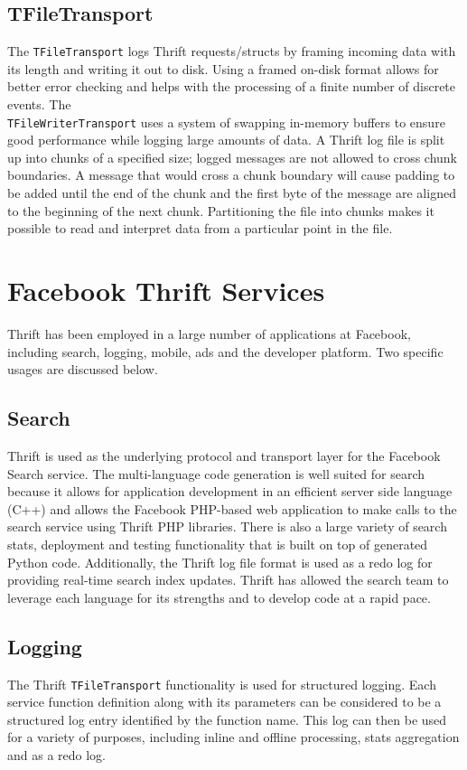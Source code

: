 \documentclass[nocopyrightspace,blockstyle]{sigplanconf}
\begin{document}
\subsection{TFileTransport}
The \texttt{TFileTransport} logs Thrift requests/structs by
framing incoming data with its length and writing it out to disk.
Using a framed on-disk format allows for better error checking and
helps with the processing of a finite number of discrete events. The\\
\texttt{TFileWriterTransport} uses a system of swapping in-memory buffers
to ensure good performance while logging large amounts of data.
A Thrift log file is split up into chunks of a specified size; logged messages
are not allowed to cross chunk boundaries. A message that would cross a chunk
boundary will cause padding to be added until the end of the chunk and the
first byte of the message are aligned to the beginning of the next chunk.
Partitioning the file into chunks makes it possible to read and interpret data
from a particular point in the file.

\section{Facebook Thrift Services}
Thrift has been employed in a large number of applications at Facebook, including
search, logging, mobile, ads and the developer platform. Two specific usages are discussed below.

\subsection{Search}
Thrift is used as the underlying protocol and transport layer for the Facebook Search service.
The multi-language code generation is well suited for search because it allows for application
development in an efficient server side language (C++) and allows the Facebook PHP-based web application
to make calls to the search service using Thrift PHP libraries. There is also a large
variety of search stats, deployment and testing functionality that is built on top
of generated Python code. Additionally, the Thrift log file format is
used as a redo log for providing real-time search index updates. Thrift has allowed the
search team to leverage each language for its strengths and to develop code at a rapid pace.

\subsection{Logging}
The Thrift \texttt{TFileTransport} functionality is used for structured logging. Each
service function definition along with its parameters can be considered to be
a structured log entry identified by the function name. This log can then be used for
a variety of purposes, including inline and offline processing, stats aggregation and as a redo log.
\end{document}
